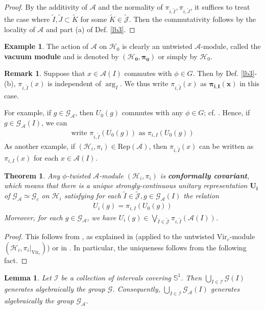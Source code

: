 \documentclass[11pt,b5paper,notitlepage]{article}
\theoremstyle{definition}
\newtheorem{eg}[df]{Example}
\newtheorem{rem}[df]{Remark}
\theoremstyle{plain}
\newtheorem{thm}[df]{Theorem}
\newtheorem{lm}[df]{Lemma}
\newcommand{\mc}{\mathcal}
\newcommand{\wtd}{\widetilde}
\newcommand{\Rep}{\mathrm{Rep}}
\newcommand{\Vir}{\mathrm{Vir}}
\newcommand{\GA}{\mathscr G_{\mathcal A}}
\newcommand{\scr}{\mathscr}
\newcommand{\Jtd}{\widetilde{\mathcal J}}
\newcommand{\Sbb}{{\mathbb S}}
\newcommand{\Gc}{\mathscr G_c}
\newcommand{\MA}{\mathcal A}
\newcommand{\MH}{\mathcal H}
\newcommand{\hqed}{\hfill\qedsymbol}
\numberwithin{equation}{section}
\begin{document}
\begin{proof}
By the additivity of $\MA$ and the normality of $\pi_{i,\wtd I},\pi_{i,\wtd J}$, it suffices to treat the case where $\wtd I,\wtd J\subset\wtd K$ for some $\wtd K\in\Jtd$. Then the commutativity follows by the locality of $\MA$ and part (a) of Def. \ref{lb3}.
\end{proof}


\begin{eg}
The action of $\MA$ on $\MH_0$ is clearly an untwisted $\MA$-module, called the \textbf{vacuum module} and is denoted by $\pmb{(\MH_0,\pi_0)}$ or simply by $\MH_0$.
\end{eg}


\begin{rem}\label{lb11}
Suppose that $x\in\MA(I)$ commutes with $\phi\in G$. Then by Def. \ref{lb3}-(b), $\pi_{i,\wtd I}(x)$ is independent of $\arg_I$. We thus write $\pi_{i,\wtd I}(x)$ as $\pmb{\pi_{i,I}(x)}$ in this case.

For example, if $g\in\GA$, then $U_0(g)$ commutes with any $\phi\in G$; cf. \cite[Rem. 3.14]{MS26a}. Hence, if $g\in\GA(I)$, we can 
\begin{align*}
\text{write $\pi_{i,\wtd I}(U_0(g))$ as $\pi_{i,I}(U_0(g))$}
\end{align*}
As another example, if $(\MH_i,\pi_i)\in\Rep(\MA)$, then $\pi_{i,\wtd I}(x)$ can be written as $\pi_{i,I}(x)$ for each $x\in\MA(I)$. \hqed
\end{rem}


\begin{thm}\label{lb12}
Any $\phi$-twisted $\MA$-module $(\MH_i,\pi_i)$ is \textbf{conformally covariant}, which means that there is a unique strongly-continuous unitary representation $\pmb{U_i}$ of $\GA\simeq\Gc$ on $\MH_i$ satisfying for each $\wtd I\in\Jtd,g\in\GA(I)$ the relation
\begin{align}
U_i(g)=\pi_{i,I}(U_0(g))
\end{align}
Moreover, for each $g\in\GA$, we have $U_i(g)\in\bigvee_{\wtd I\in\Jtd}\pi_{i,\wtd I}(\MA(I))$.
\end{thm}


\begin{proof}
This follows from \cite{Hen19}, as explained in \cite[Thm. 2.2]{Gui21a} (applied to the untwisted $\Vir_c$-module $(\MH_i,\pi_i|_{\Vir_c})$) or in \cite[Thm. 3.15]{MS26a}. In particular, the uniqueness follows from the following fact.
\end{proof}

\begin{lm}\label{lb14}
Let $\mc I$ be a collection of intervals covering $\Sbb^1$. Then $\bigcup_{I\in\mc I}\scr G(I)$ generates algebraically the group $\scr G$. Consequently, $\bigcup_{I\in\mc I}\GA(I)$ generates algebraically the group $\GA$.
\end{lm}
\end{document}
